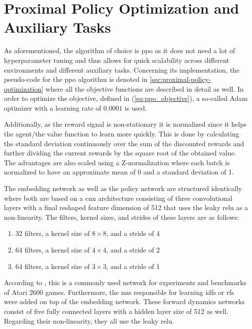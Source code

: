 \documentclass[draft,final]{vutinfth} %
\newcommand{\pautoref}[1]{(\autoref{#1})}
\begin{document}
    \section{Proximal Policy Optimization and Auxiliary Tasks}\label{sec:proximal-policy-optimization-and-auxiliary-tasks}

    As aforementioned, the algorithm of choice is \gls{ppo} as it does not need a lot of hyperparameter tuning and thus allows for quick scalability across different environments and different auxiliary tasks.
    Concerning its implementation, the pseudo-code for the \gls{ppo} algorithm is denoted in \autoref{sec:proximal-policy-optimization} where all the objective functions are described in detail as well.
    In order to optimize the objective, defined in \pautoref{eq:ppo_objective}, a so-called Adam optimizer with a learning rate of $0.0001$ is used.

    Additionally, as the reward signal is non-stationary it is normalized since it helps the agent/the value function to learn more quickly.
    This is done by calculating the standard deviation continuously over the sum of the discounted rewards and further dividing the current rewards by the square root of the obtained value.
    The advantages are also scaled using a Z-normalization where each batch is normalized to have an approximate mean of 0 and a standard deviation of 1.

    The embedding network as well as the policy network are structured identically where both are based on a \gls{cnn} architecture consisting of three convolutional layers with a final reshaped feature dimension of 512 that uses the leaky \gls{relu} as a non-linearity.
    The filters, kernel sizes, and strides of these layers are as follows:

    \begin{enumerate}
        \item 32 filters, a kernel size of $8 \times 8$, and a stride of 4
        \item 64 filters, a kernel size of $4 \times 4$, and a stride of 2
        \item 64 filters, a kernel size of $3 \times 3$, and a stride of 1
    \end{enumerate}

    According to \citet{burda_large-scale_2018-1}, this is a commonly used network for experiments and benchmarks of Atari 2600 games.
    Furthermore, the \glspl{nn} responsible for learning \glspl{idf} or \glspl{rf}  were added on top of the embedding network.
    These forward dynamics networks consist of five fully connected layers with a hidden layer size of 512 as well.
    Regarding their non-linearity, they all use the leaky \gls{relu}.
\end{document}

